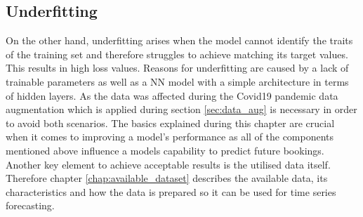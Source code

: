 \subsection{Underfitting}
On the other hand, underfitting arises when the model cannot identify the traits of the training set and therefore struggles to achieve matching its target values. This results in high loss values. Reasons for underfitting are caused by a lack of trainable parameters as well as a NN model with a simple architecture in terms of hidden layers. \cite{fitting} 
\newline
\newline
As the data was affected during the Covid19 pandemic data augmentation which is applied during section \ref{sec:data_aug} is necessary in order to avoid both scenarios.
\newline
\newline
The basics explained during this chapter are crucial when it comes to improving a model's performance as all of the components mentioned above influence a models capability to predict future bookings. Another key element to achieve acceptable results is the utilised data itself. Therefore chapter \ref{chap:available_dataset} describes the available data, its characteristics and how the data is prepared so it can be used for time series forecasting. 
 
